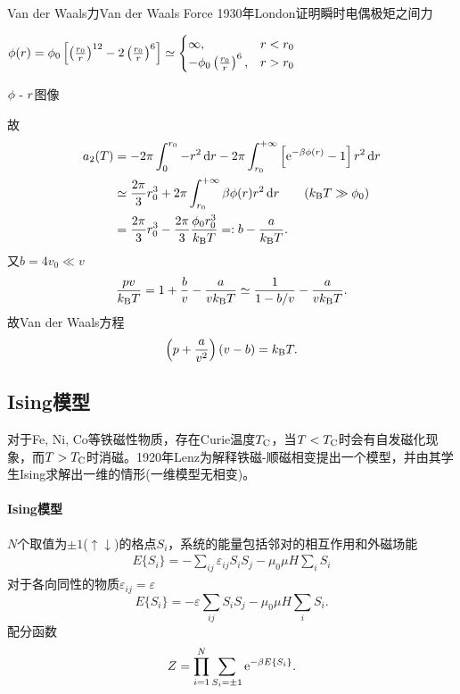 \begin{example}{Van der Waals力}{Van der Waals Force}
	1930年London证明瞬时电偶极矩之间力
	\begin{center}
		\(\phi(r)=\phi_0\left[\left(\frac{r_0}r\right)^{12}-2\left(\frac{r_0}r\right)^6\right]\simeq\begin{cases}
			\infty,&r<r_0\\
			-\phi_0\left(\frac{r_0}r\right)^6,&r>r_0
		\end{cases}\)

		\tikzchap $\phi~\text{-}~ r$图像
	\end{center}
	故
	{\begin{align*}
		a_2(T)&=-2\pi\int_0^{r_0}-r^2\d r-2\pi\int_{r_0}^{+\infty}\fkh{\e{-\beta\phi(r)}-1}r^2\d r\\
		&\simeq\frac{2\pi}3r_0^3+2\pi\int_{r_0}^{+\infty}\beta\phi(r)r^2\d r\tag{$\kB T\gg\phi_0$}\\
		&=\frac{2\pi}3r_0^3-\frac{2\pi}3\frac{\phi_0r_0^3}{\kB T}=:b-\frac a{\kB T}.
	\end{align*}}
	又$b=4v_0\ll v$
	\[
		\frac{pv}{k_{\mathrm B} T}=1+\frac bv-\frac a{vk_{\mathrm B} T}\simeq\frac1{1-b/v}-\frac a{vk_{\mathrm B} T}.
	\]
	故Van der Waals方程
	\begin{align}
		\left(p+\frac a{v^2}\right)(v-b)=k_{\mathrm B} T.
	\end{align}
\end{example}
\subsection{Ising模型}
对于Fe, Ni, Co等铁磁性物质，存在Curie温度$T_\mathrm C$，当$T<T_\mathrm C$时会有自发磁化现象，而$T>T_\mathrm C$时消磁。1920年Lenz为解释铁磁-顺磁相变提出一个模型，并由其学生Ising求解出一维的情形(一维模型无相变)。

\paragraph*{Ising模型}$N$个取值为$\pm 1$($\uparrow\downarrow$)的格点$S_i$，系统的能量包括邻对的相互作用和外磁场能
\begin{align}
	E\{S_i\}=-\sum_{ij}\varepsilon_{ij}S_iS_j-\mu_0\mu H\sum_iS_i
\end{align}
对于各向同性的物质$\varepsilon_{ij}=\varepsilon$
\[
	E\{S_i\}=-\varepsilon\sum_{ij}S_iS_j-\mu_0\mu H\sum_iS_i.
\]
配分函数
\[
	Z=\prod_{i=1}^N\sum_{S_i=\pm 1}\mathop{}\!\mathrm{e}^{-\beta E\{S_i\}}.\]
